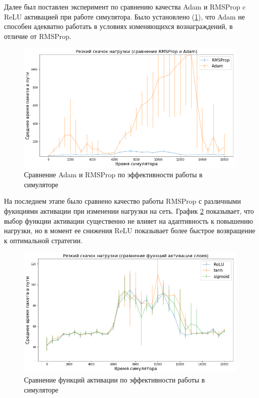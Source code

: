 \documentclass[specification, annotation]{itmo-student-thesis}
\begin{document}
Далее был поставлен эксперимент по сравнению качества Adam и RMSProp c ReLU
активацией при работе симулятора. Было установлено
(\ref{experiment-adam-failure}), что Adam не способен адекватно работать в
условиях изменяющихся вознаграждений, в отличие от RMSProp.

\begin{figure}[!h]
  \caption{Сравнение Adam и RMSProp по эффективности работы в
    симуляторе}\label{experiment-adam-failure}
  \centering
  \includegraphics[scale=0.6]{experiment-adam-failure}
\end{figure}

На последнем этапе было сравнено качество работы RMSProp с различными фукнциями
активации при изменении нагрузки на сеть. График
\ref{experiment-activations-launch} показывает, что выбор функции активации
существенно не влияет на адаптивность к повышению нагрузки, но в момент ее
снижения ReLU показывает более быстрое возвращение к оптимальной стратегии.

\begin{figure}[!h]
  \caption{Сравнение функций активации по эффективности работы в
    симуляторе}\label{experiment-activations-launch}
  \centering
  \includegraphics[scale=0.6]{experiment-activations-launch}
\end{figure}
\end{document}
